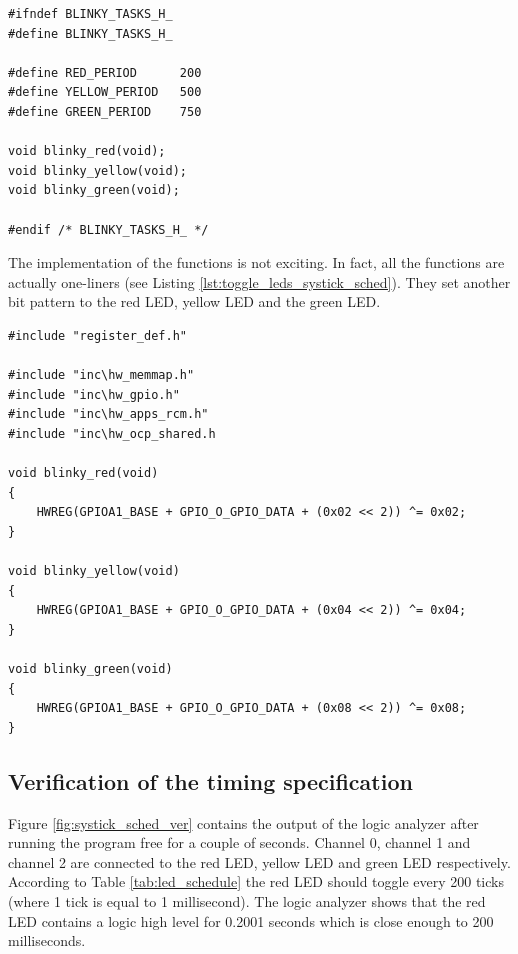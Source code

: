 \begin{lstlisting}[style=CStyle, caption={\texttt{blinky\_tasks.h} prototyping the functions tasks should be called and their period}, captionpos=b, label={lst:blinkytask_h}, escapechar=@]
#ifndef BLINKY_TASKS_H_
#define BLINKY_TASKS_H_

#define RED_PERIOD      200
#define YELLOW_PERIOD   500
#define GREEN_PERIOD    750

void blinky_red(void);
void blinky_yellow(void);
void blinky_green(void);

#endif /* BLINKY_TASKS_H_ */

\end{lstlisting}

The implementation of the functions is not exciting.
In fact, all the functions are actually one-liners (see Listing \ref{lst:toggle_leds_systick_sched}).
They set another bit pattern to the red LED, yellow LED and the green LED.

\begin{lstlisting}[style=CStyle, caption={Toggling LED tasks according to Table \ref{tab:led_schedule} }, captionpos=b, label={lst:toggle_leds_systick_sched}, escapechar=@]
#include "register_def.h"

#include "inc\hw_memmap.h"
#include "inc\hw_gpio.h"
#include "inc\hw_apps_rcm.h"
#include "inc\hw_ocp_shared.h

void blinky_red(void)
{
    HWREG(GPIOA1_BASE + GPIO_O_GPIO_DATA + (0x02 << 2)) ^= 0x02;
}

void blinky_yellow(void)
{
    HWREG(GPIOA1_BASE + GPIO_O_GPIO_DATA + (0x04 << 2)) ^= 0x04;
}

void blinky_green(void)
{
    HWREG(GPIOA1_BASE + GPIO_O_GPIO_DATA + (0x08 << 2)) ^= 0x08;
}
\end{lstlisting}

\subsection{Verification of the timing specification}

Figure \ref{fig:systick_sched_ver} contains the output of the logic analyzer after running the program free for a couple of seconds.
Channel 0, channel 1 and channel 2 are connected to the red LED, yellow LED and green LED respectively.
According to Table \ref{tab:led_schedule} the red LED should toggle every 200 ticks (where 1 tick is equal to 1 millisecond).
The logic analyzer shows that the red LED contains a logic high level for 0.2001 seconds which is close enough to 200 milliseconds.

